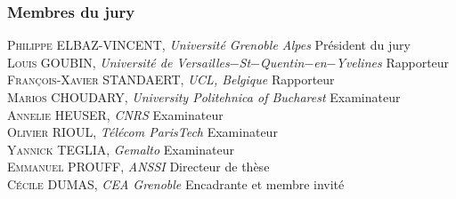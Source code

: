 \begin{frame}
\frametitle{Membres du jury}

 \textsc{Philippe ELBAZ-VINCENT, } \textit{Universit\'e Grenoble Alpes} \hfill Pr\'esident du jury\\ 
  \textsc{Louis GOUBIN, } \normalsize{\textit{Universit\'e de 
Versailles$-$St$-$Quentin$-$en$-$Yvelines}} \hfill \large{Rapporteur\\
\textsc{Fran\c{c}ois-Xavier STANDAERT, } \textit{UCL, Belgique} \hfill Rapporteur\\
\textsc{Marios CHOUDARY, } \textit{University Politehnica of Bucharest} \hfill Examinateur\\
 \textsc{Annelie HEUSER, } \textit{CNRS} \hfill Examinateur\\
  \textsc{Olivier RIOUL, } \textit{T\'el\'ecom ParisTech} \hfill Examinateur \\
 \textsc{Yannick TEGLIA, } \textit{Gemalto} \hfill Examinateur\\
 \textsc{Emmanuel PROUFF, } \textit{ANSSI} \hfill Directeur de th\`ese \\
 \textsc{C\'ecile DUMAS, } \textit{CEA Grenoble} \hfill Encadrante et membre invit\'e }


\end{frame}



